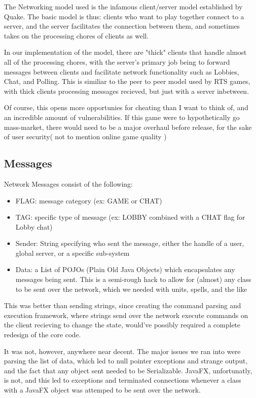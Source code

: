 \documentclass[12pt,a4paper]{article}
\begin{document}
The Networking model used is the infamous client/server model established by Quake. 
The basic model is thus: clients who want to play together connect to a server, and the server facilitates the connection between them, 
and sometimes takes on the processing chores of clients as well.

In our implementation of the model, there are "thick" clients that handle almost all of the processing chores, 
with the server's primary job being to forward messages between clients and facilitate network functionality such as Lobbies, Chat, and Polling.
This is similiar to the peer to peer model used by RTS games, with thick clients processing messages recieved, but just with a server inbetween.

Of course, this opens more opportunies for cheating than I want to think of, and an incredible amount of vulnerabilities. If this game were to 
hypothetically go mass-market, there would need to be a major overhaul before release, for the sake of user security( not to mention online game quality )

\subsection{Messages}

Network Messages consist of the following:
\begin{itemize}
\item{FLAG:  message category (ex: GAME or CHAT)}
\item{TAG:  specific type of message (ex: LOBBY combined with a CHAT flag for Lobby chat)}
\item{Sender: String specifying who sent the message, either the handle of a user, global server, or a specific sub-system}
\item{Data: a List of POJOs (Plain Old Java Objects) which encapsulates any messages being sent. This is a semi-rough hack to allow for
 (almost) any class to be sent over the network, which we needed with units, spells, and the like}
\end{itemize}

This was better than sending strings, since creating the command parsing and execution framework, where strings send over the network
execute commands on the client recieving to change the state, would've possibly required a complete redesign of the core code.

It was not, however, anywhere near decent. The major issues we ran into were parsing the list of data, which led to null pointer exceptions
and strange output, and the fact that any object sent needed to be Serializable. JavaFX, unfortunatly, is not, and this led to exceptions and terminated
connections whenever a class with a JavaFX object was attemped to be sent over the network.
\end{document}
